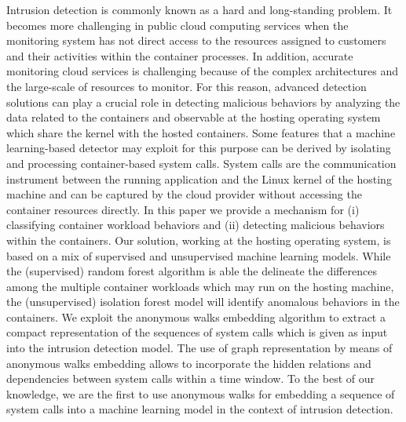 Intrusion detection is commonly known as a hard and long-standing problem. It becomes more challenging in public cloud computing services when the monitoring system has not direct access to the resources assigned to  customers and their activities within the container processes. In addition, accurate monitoring cloud services is challenging because of the complex architectures and the large-scale of resources to monitor. For this reason, advanced detection solutions can play a crucial role in detecting malicious behaviors by analyzing the data related to the containers and observable at the hosting operating system which share the kernel with the hosted containers. Some features that a machine learning-based detector may exploit for this purpose can be derived by isolating and processing container-based system calls. System calls are the communication instrument between the running application and the Linux kernel of the hosting machine and can be captured by the cloud provider without accessing the container resources directly.
In this paper we provide a mechanism for (i) classifying container workload behaviors and (ii) detecting malicious behaviors within the containers. Our solution, working at the hosting operating system, is based on a mix of supervised and unsupervised machine learning models. While the (supervised) random forest algorithm is able the delineate the differences among the multiple container workloads which may run on the hosting machine, the (unsupervised) isolation forest model will identify anomalous behaviors in the containers. We exploit the anonymous walks embedding algorithm to extract a compact representation of the sequences of system calls which is given as input into the intrusion detection model. The use of graph representation by means of anonymous walks embedding allows to incorporate the hidden relations and dependencies between system calls within a time window.
To the best of our knowledge, we are the first to use anonymous walks for embedding a sequence of system calls into a machine learning model in the context of intrusion detection.


